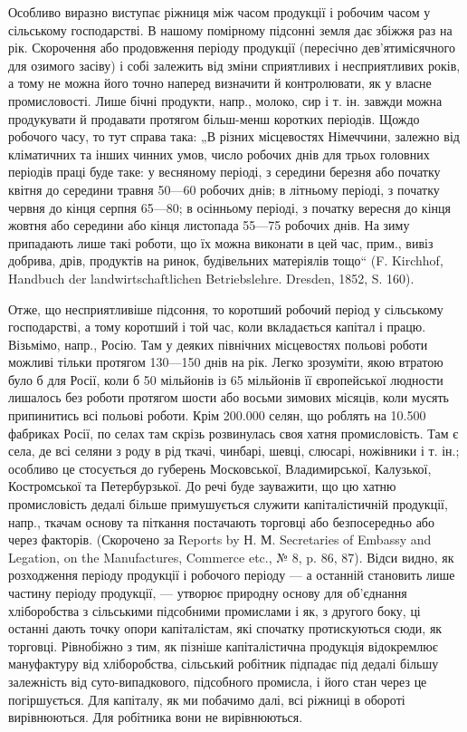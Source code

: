 Особливо виразно виступає ріжниця між часом продукції і робочим
часом у сільському господарстві. В нашому помірному підсонні земля дає
збіжжя раз на рік. Скорочення або продовження періоду продукції (пересічно
дев’ятимісячного для озимого засіву) і собі залежить від зміни
сприятливих і несприятливих років, а тому не можна його точно наперед
визначити й контролювати, як у власне промисловості. Лише бічні продукти,
напр., молоко, сир і т. ін. завжди можна продукувати й продавати
протягом більш-менш коротких періодів. Щождо робочого часу, то тут
справа така: „В різних місцевостях Німеччини, залежно від кліматичних
та інших чинних умов, число робочих днів для трьох головних періодів
праці буде таке: у весняному періоді, з середини березня або початку
квітня до середини травня 50—60 робочих днів; в літньому періоді, з початку
червня до кінця серпня 65—80; в осінньому періоді, з початку
вересня до кінця жовтня або середини або кінця листопада 55—75 робочих
днів. На зиму припадають лише такі роботи, що їх можна виконати
в цей час, прим., вивіз добрива, дрів, продуктів на ринок, будівельних
матеріялів тощо“ (F. Kirchhof, Handbuch der landwirtschaftlichen
Betriebslehre. Dresden, 1852, S. 160).

Отже, що несприятливіше підсоння, то коротший робочий період у
сільському господарстві, а тому коротший і той час, коли вкладається
капітал і працю. Візьмімо, напр., Росію. Там у деяких північних місцевостях
польові роботи можливі тільки протягом 130—150 днів на рік.
Легко зрозуміти, якою втратою було б для Росії, коли б 50 мільйонів
із 65 мільйонів її європейської людности лишалось без роботи протягом
шости або восьми зимових місяців, коли мусять припинитись всі польові
роботи. Крім 200.000 селян, що роблять на 10.500 фабриках Росії, по
селах там скрізь розвинулась своя хатня промисловість. Там є села, де
всі селяни з роду в рід ткачі, чинбарі, шевці, слюсарі, ножівники і т.
ін.; особливо це стосується до губерень Московської, Владимирської, Калузької,
Костромської та Петербурзької. До речі буде зауважити, що цю
хатню промисловість дедалі більше примушується служити капіталістичній
продукції, напр., ткачам основу та піткання постачають торговці або
безпосередньо або через факторів. (Скорочено за Reports by Н. М. Secretaries
of Embassy and Legation, on the Manufactures, Commerce etc.,
№ 8, p. 86, 87). Відси видно, як розходження періоду продукції і робочого
періоду — а останній становить лише частину періоду продукції, —
утворює природну основу для об’єднання хліборобства з сільськими підсобними
промислами і як, з другого боку, ці останні дають точку опори
капіталістам, які спочатку протискуються сюди, як торговці. Рівнобіжно
з тим, як пізніше капіталістична продукція відокремлює мануфактуру від
хліборобства, сільський робітник підпадає під дедалі більшу залежність
від суто-випадкового, підсобного промисла, і його стан через це погіршується.
Для капіталу, як ми побачимо далі, всі ріжниці в обороті вирівнюються.
Для робітника вони не вирівнюються.

